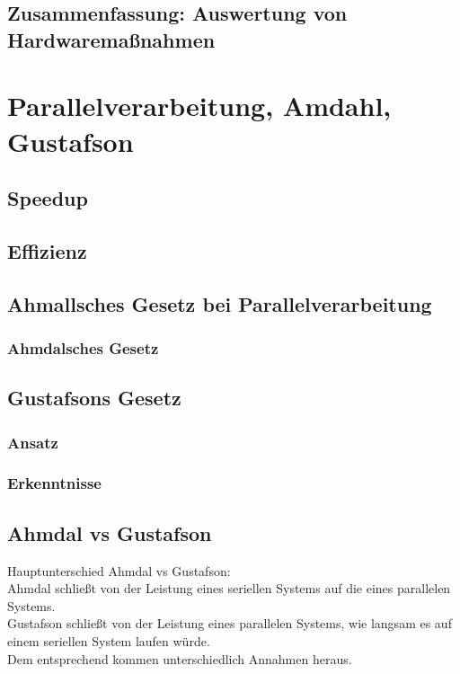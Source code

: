 \subsection{Zusammenfassung: Auswertung von Hardwaremaßnahmen}

\section{Parallelverarbeitung, Amdahl, Gustafson}
\subsection{Speedup}

\subsection{Effizienz}

\subsection{Ahmallsches Gesetz bei Parallelverarbeitung}
\subsubsection{Ahmdalsches Gesetz}

\subsection{Gustafsons Gesetz}
\subsubsection{Ansatz}
\subsubsection{Erkenntnisse}
\subsection{Ahmdal vs Gustafson}
Hauptunterschied Ahmdal vs Gustafson:\\
Ahmdal schließt von der Leistung eines seriellen Systems auf die eines parallelen Systems.\\
Gustafson schließt von der Leistung eines parallelen Systems, wie langsam es auf einem seriellen System laufen würde.\\
Dem entsprechend kommen unterschiedlich Annahmen heraus.

